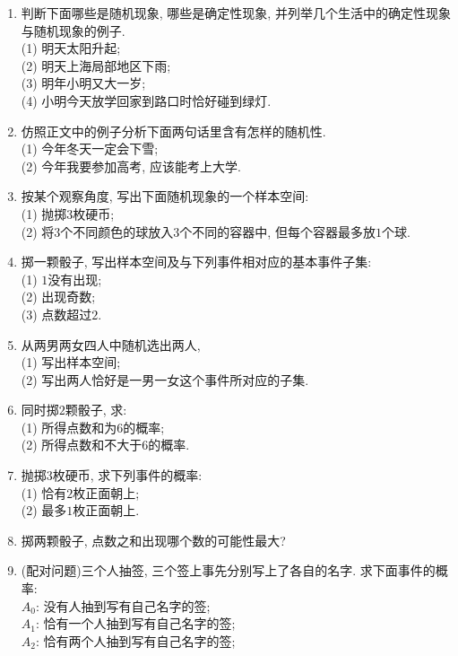 \documentclass[10pt,a4paper]{article}
\begin{document}
\begin{enumerate}[1.]
\begin{center}
\end{center}
\item 判断下面哪些是随机现象, 哪些是确定性现象, 并列举几个生活中的确定性现象与随机现象的例子.\\
(1) 明天太阳升起;\\
(2) 明天上海局部地区下雨;\\
(3) 明年小明又大一岁;\\
(4) 小明今天放学回家到路口时恰好碰到绿灯.
\item 仿照正文中的例子分析下面两句话里含有怎样的随机性.\\
(1) 今年冬天一定会下雪;\\
(2) 今年我要参加高考, 应该能考上大学.
\item 按某个观察角度, 写出下面随机现象的一个样本空间:\\
(1) 抛掷$3$枚硬币;\\
(2) 将$3$个不同颜色的球放入$3$个不同的容器中, 但每个容器最多放$1$个球.
\item 掷一颗骰子, 写出样本空间及与下列事件相对应的基本事件子集:\\
(1) $1$没有出现;\\
(2) 出现奇数;\\
(3) 点数超过$2$.
\item 从两男两女四人中随机选出两人,\\
(1) 写出样本空间;\\
(2) 写出两人恰好是一男一女这个事件所对应的子集.
\item 同时掷$2$颗骰子, 求:\\
(1) 所得点数和为$6$的概率;\\
(2) 所得点数和不大于$6$的概率.
\item 抛掷$3$枚硬币, 求下列事件的概率:\\
(1) 恰有$2$枚正面朝上;\\
(2) 最多$1$枚正面朝上.
\item 掷两颗骰子, 点数之和出现哪个数的可能性最大?
\item (配对问题)三个人抽签, 三个签上事先分别写上了各自的名字. 求下面事件的概率:\\
$A_0$: 没有人抽到写有自己名字的签;\\
$A_1$: 恰有一个人抽到写有自己名字的签;\\
$A_2$: 恰有两个人抽到写有自己名字的签;\\

\end{enumerate}
\end{document}
